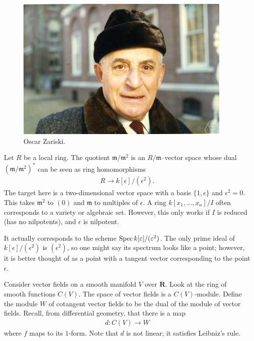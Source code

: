 \documentclass[11pt, oneside,margin=1in]{article}
\begin{document}
\begin{figure}
\begin{center}
\includegraphics[scale=0.8]{images/zariski}
\caption{Oscar Zariski.}
\end{center}
\end{figure}


Let $R$ be a local ring. The quotient $\mathfrak{m}/\mathfrak{m}^2$ is an $R/\mathfrak{m}$--vector space whose dual $(\mathfrak{m}/\mathfrak{m}^2) ^*$ can be seen as ring homomorphisms 
\begin{align*}
	R\longrightarrow k[\epsilon]/(\epsilon^2).
\end{align*}
The target here is a two-dimensional vector space with a basis $\{1,\epsilon\}$ and $\epsilon^2=0$. This takes $\mathfrak{m}^2$ to $(0)$ and $\mathfrak{m}$ to multiples of $\epsilon$. A ring $k[x_1,\hdots, x_n]/I$ often corresponds to a variety or algebraic set. However, this only works if $I$ is reduced (has no nilpotents), and $\epsilon$ is nilpotent. 

It actually corresponds to the scheme $\operatorname{Spec} k[\varepsilon]/(\varepsilon^2)$. The only prime ideal of $k[\epsilon]/(\epsilon^2)$ is $(\epsilon^2)$, so one might say its spectrum looks like a point; however, it is better thought of as a point with a tangent vector corresponding to the point $\epsilon$.

Consider vector fields on a smooth manifold $V$ over $\mathbf{R}$. Look at the ring of smooth functions $C(V)$. The space of vector fields is a $C(V)$-module. Define the module $W$ of cotangent vector fields to be the dual of the module of vector fields. Recall, from differential geometry, that there is a map
\begin{align*}
	d:C(V) \longrightarrow W
\end{align*}
where $f$ maps to its $1$-form. Note that $d$ is not linear; it satisfies Leibniz's rule. 
\end{document}
